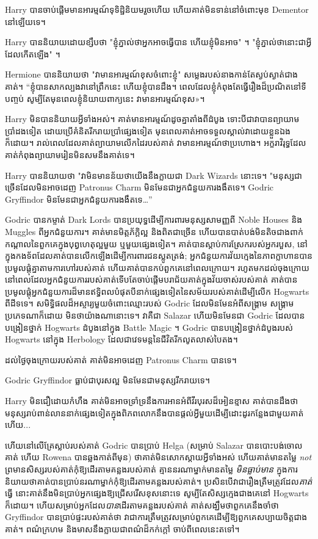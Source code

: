 Harry បានចាប់ផ្តើមមានអារម្មណ៍ទុទិដ្ឋិនិយមរួចហើយ ហើយគាត់មិនទាន់នៅចំពោះមុខ Dementor នៅឡើយទេ។

Harry បាននិយាយដោយខ្សឹបថា "ខ្ញុំភ្នាល់ថាអ្នកអាចធ្វើបាន ហើយខ្ញុំមិនអាច" ។ "ខ្ញុំភ្នាល់ថានោះជាអ្វីដែលកើតឡើង" ។

Hermione បាននិយាយថា "វាមានអារម្មណ៍ខុសចំពោះខ្ញុំ" សម្លេងរបស់នាងកាន់តែស្ងប់ស្ងាត់ជាងគាត់។ “ខ្ញុំបានសាកល្បងវានៅព្រឹកនេះ ហើយខ្ញុំបានដឹង។ ពេល​ដែល​ខ្ញុំ​កំពុង​តែ​ធ្វើ​រឿង​ដ៏​ប្រណិត​នៅ​ទី​បញ្ចប់ សូម្បី​តែ​មុន​ពេល​ខ្ញុំ​និយាយ​ពាក្យ​នេះ វា​មាន​អារម្មណ៍​ខុស»។

Harry មិនបាននិយាយអ្វីទាំងអស់។ គាត់មានអារម្មណ៍ដូចគ្នាតាំងពីដំបូង ទោះបីជាវាបានព្យាយាមប្រាំដងទៀត ដោយប្រើគំនិតរីករាយប្រាំផ្សេងទៀត មុនពេលគាត់អាចទទួលស្គាល់វាដោយខ្លួនឯងក៏ដោយ។ រាល់ពេលដែលគាត់ព្យាយាមលើកដៃរបស់គាត់ វាមានអារម្មណ៍ថាប្រហោង។ អក្ខរាវិរុទ្ធដែលគាត់កំពុងព្យាយាមរៀនមិនសមនឹងគាត់ទេ។

Harry បាននិយាយថា "វាមិនមានន័យថាយើងនឹងក្លាយជា Dark Wizards នោះទេ។ "មនុស្សជាច្រើនដែលមិនអាចដេញ Patronus Charm មិនមែនជាអ្នកជំនួយការងងឹតទេ។ Godric Gryffindor មិនមែនជាអ្នកជំនួយការងងឹតទេ…”

Godric បានកម្ចាត់ Dark Lords បានប្រយុទ្ធដើម្បីការពារមនុស្សសាមញ្ញពី Noble Houses និង Muggles ពីអ្នកជំនួយការ។ គាត់​មាន​មិត្តភ័ក្តិ​ល្អ និង​ពិត​ជា​ច្រើន ហើយ​បាន​បាត់​បង់​មិន​តិច​ជាង​ពាក់​កណ្តាល​នៃ​ពួក​គេ​ក្នុង​បុព្វហេតុ​ល្អ​មួយ ឬ​មួយ​ផ្សេង​ទៀត។ គាត់​បាន​ស្តាប់​ការ​ស្រែក​របស់​អ្នក​របួស, នៅ​ក្នុង​កង​ទ័ព​ដែល​គាត់​បាន​លើក​ឡើង​ដើម្បី​ការពារ​ជន​ស្លូត​ត្រង់; អ្នកជំនួយការវ័យក្មេងនៃភាពក្លាហានបានប្រមូលផ្តុំគ្នាតាមការហៅរបស់គាត់ ហើយគាត់បានកប់ពួកគេនៅពេលក្រោយ។ រហូតមកដល់ចុងក្រោយ នៅពេលដែលអ្នកជំនួយការរបស់គាត់ទើបតែចាប់ផ្តើមបរាជ័យគាត់ក្នុងវ័យចាស់របស់គាត់ គាត់បានប្រមូលផ្តុំអ្នកជំនួយការដ៏មានឥទ្ធិពលបំផុតបីនាក់ផ្សេងទៀតនៃសម័យរបស់គាត់ដើម្បីលើក Hogwarts ពីដីទទេ។ សមិទ្ធិផលដ៏អស្ចារ្យមួយចំពោះឈ្មោះរបស់ Godric ដែលមិនមែនអំពីសង្គ្រាម សង្គ្រាមប្រភេទណាក៏ដោយ មិនថាយ៉ាងណានោះទេ។ វាគឺជា Salazar ហើយមិនមែនជា Godric ដែលបានបង្រៀនថ្នាក់ Hogwarts ដំបូងនៅក្នុង Battle Magic ។ Godric បានបង្រៀនថ្នាក់ដំបូងរបស់ Hogwarts នៅក្នុង Herbology ដែលជាវេទមន្តនៃជីវិតរីកលូតលាស់បៃតង។

ដល់​ថ្ងៃ​ចុង​ក្រោយ​របស់​គាត់ គាត់​មិន​អាច​ដេញ Patronus Charm បាន​ទេ។

Godric Gryffindor ធ្លាប់ជាបុរសល្អ មិនមែនជាមនុស្សរីករាយទេ។

Harry មិន​ជឿ​ដោយ​កំហឹង គាត់​មិន​អាច​ទ្រាំទ្រ​នឹង​ការ​អាន​អំពី​វីរបុរស​ដ៏​អៀនខ្មាស គាត់​បាន​ដឹង​ថា​មនុស្ស​រាប់​ពាន់​លាន​នាក់​ផ្សេង​ទៀត​ក្នុង​ពិភពលោក​នឹង​បាន​ផ្តល់​អ្វី​មួយ​ដើម្បី​ដោះដូរ​កន្លែង​ជាមួយ​គាត់ ហើយ...

ហើយនៅលើគ្រែស្លាប់របស់គាត់ Godric បានប្រាប់ Helga (សម្រាប់ Salazar បានបោះបង់ចោលគាត់ ហើយ Rowena បានឆ្លងកាត់ពីមុន) ថាគាត់មិនសោកស្តាយអ្វីទាំងអស់ ហើយគាត់មានតម្លៃ \emph{not} ព្រមានសិស្សរបស់គាត់កុំឱ្យដើរតាមគន្លងរបស់គាត់ គ្មាននរណាម្នាក់មានតម្លៃ \emph{មិនធ្លាប់មាន} ក្នុងការនិយាយថាគាត់បានប្រាប់នរណាម្នាក់កុំឱ្យដើរតាមគន្លងរបស់គាត់។ ប្រសិនបើវាជារឿងត្រឹមត្រូវដែល\emph{គាត់}ធ្វើ នោះគាត់នឹងមិនប្រាប់អ្នកផ្សេងឱ្យជ្រើសរើសខុសនោះទេ សូម្បីតែសិស្សក្មេងជាងគេនៅ Hogwarts ក៏ដោយ។ ហើយសម្រាប់អ្នកដែល\emph{បាន}ដើរតាមគន្លងរបស់គាត់ គាត់សង្ឃឹមថាពួកគេនឹងចាំថា Gryffindor បានប្រាប់ផ្ទះរបស់គាត់ថា វាជាការត្រឹមត្រូវសម្រាប់ពួកគេដើម្បីឱ្យពួកគេសប្បាយចិត្តជាងគាត់។ ពណ៌ក្រហម និងមាសនឹងក្លាយជាពណ៌ដ៏កក់ក្តៅ ចាប់ពីពេលនេះតទៅ។


